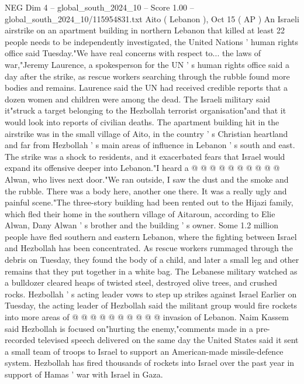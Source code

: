 \begin{textsample}{NEG Dim 4 – global\_south\_2024\_10 – Score 1.00 – global\_south\_2024\_10/115954831.txt}  \label{ex:f4_neg_064}
Aito ( Lebanon ), Oct 15 ( AP ) An Israeli airstrike on an apartment building in northern Lebanon that killed at least 22 people needs to be independently investigated, the United Nations ' human rights office said Tuesday."We have real concerns with respect to... the laws of war,"Jeremy Laurence, a spokesperson for the UN ' s human rights office said a day after the strike, as rescue workers searching through the rubble found more bodies and remains.
Laurence said the UN had received credible reports that a dozen women and children were among the dead.
The Israeli military said it"struck a target belonging to the Hezbollah terrorist organisation"and that it would look into reports of civilian deaths.
The apartment building hit in the airstrike was in the small village of Aito, in the country ' s Christian heartland and far from Hezbollah ' s main areas of influence in Lebanon ' s south and east.
The strike was a shock to residents, and it exacerbated fears that Israel would expand its offensive deeper into Lebanon."I heard a @ @ @ @ @ @ @ @ @ @ Alwan, who lives next door."We ran outside, I saw the dust and the smoke and the rubble.
There was a body here, another one there.
It was a really ugly and painful scene."The three-story building had been rented out to the Hijazi family, which fled their home in the southern village of Aitaroun, according to Elie Alwan, Dany Alwan ' s brother and the building ' s owner.
Some 1.2 million people have fled southern and eastern Lebanon, where the fighting between Israel and Hezbollah has been concentrated.
As rescue workers rummaged through the debris on Tuesday, they found the body of a child, and later a small leg and other remains that they put together in a white bag.
The Lebanese military watched as a bulldozer cleared heaps of twisted steel, destroyed olive trees, and crushed rocks.
Hezbollah ' s acting leader vows to step up strikes against Israel Earlier on Tuesday, the acting leader of Hezbollah said the militant group would fire rockets into more areas of @ @ @ @ @ @ @ @ @ @ invasion of Lebanon.
Naim Kassem said Hezbollah is focused on"hurting the enemy,"comments made in a pre-recorded televised speech delivered on the same day the United States said it sent a small team of troops to Israel to support an American-made missile-defence system.
Hezbollah has fired thousands of rockets into Israel over the past year in support of Hamas ' war with Israel in Gaza.

\end{textsample}
